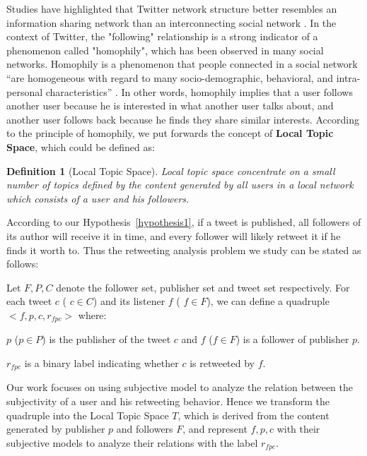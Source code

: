 \documentclass{acm_proc_article-sp}
\newtheorem{definition}{Definition}
\begin{document}
Studies have highlighted that Twitter network structure better resembles an information sharing network than an interconnecting social network \cite{Boyd2010,Kwak:2010TSN}. 
In the context of Twitter, the "following" relationship is a strong indicator of a phenomenon called "homophily", which has been observed in many social networks.
Homophily is a phenomenon that people connected in a social network ``are homogeneous with regard to many socio-demographic, behavioral, and intra-personal characteristics'' \cite{mcpherson2001birds}.
In other words, homophily implies that a user follows another user because he is interested in what another user talks about, and another user follows back because he finds they share similar interests. 
According to the principle of homophily, we put forwards the concept of \textbf{Local Topic Space}, which could be defined as:
\begin{definition}[Local Topic Space]
\label{local}
Local topic space concentrate on a small number of topics defined by the content generated by all users in a local network which consists of a user and his followers.
\end{definition}

According to our Hypothesis~\ref{hypothesis1}, if a tweet is published, all followers of its author will receive it in time, and every follower will likely retweet it if he finds it worth to. 
Thus the retweeting analysis problem we study can be stated as follows:

Let $ F, P, C $ denote the follower set, publisher set and tweet set respectively. 
For each tweet $c$ ( $ c \in C $) and its listener $ f $ ( $ f \in F $), we can define a quadruple $ <f, p, c, r_{fpc}>  $ where: 
\begin{itemize*}
\item  $p$ ($p \in P $) is the publisher of the tweet $c$ and $f$ ($ f \in F $) is a follower of publisher $p$.
\item $ r_{fpc} $ is a binary label indicating whether $ c $ is retweeted by $ f $.
\end{itemize*}

Our work focuses on using subjective model to analyze the relation between the subjectivity of a user and his retweeting behavior. 
Hence we transform the quadruple into the Local Topic Space $ T $, which is derived from the content generated by publisher $ p $ and followers $F $, and represent $ f, p, c $ with their subjective models to analyze their relations with the label $ r_{fpc} $.
\end{document}
